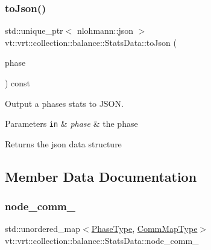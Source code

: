 \mbox{\label{structvt_1_1vrt_1_1collection_1_1balance_1_1_stats_data_ac864e580e764d093b427e459d46b2bd4}} 
\subsubsection{\texorpdfstring{to\+Json()}{toJson()}}
{\footnotesize\ttfamily std\+::unique\+\_\+ptr$<$ nlohmann\+::json $>$ vt\+::vrt\+::collection\+::balance\+::\+Stats\+Data\+::to\+Json (\begin{DoxyParamCaption}\item[{\hyperlink{namespacevt_a46ce6733d5cdbd735d561b7b4029f6d7}{Phase\+Type}}]{phase }\end{DoxyParamCaption}) const}



Output a phase\textquotesingle{}s stats to J\+S\+ON. 


\begin{DoxyParams}[1]{Parameters}
\mbox{\tt in}  & {\em phase} & the phase\\
\hline
\end{DoxyParams}
\begin{DoxyReturn}{Returns}
the json data structure 
\end{DoxyReturn}


\subsection{Member Data Documentation}
\mbox{\label{structvt_1_1vrt_1_1collection_1_1balance_1_1_stats_data_a5ee2aea35e48a4855c8f99c16b588287}} 
\subsubsection{\texorpdfstring{node\+\_\+comm\+\_\+}{node\_comm\_}}
{\footnotesize\ttfamily std\+::unordered\+\_\+map$<$\hyperlink{namespacevt_a46ce6733d5cdbd735d561b7b4029f6d7}{Phase\+Type}, \hyperlink{namespacevt_1_1vrt_1_1collection_1_1balance_a10860c956804d644db54a16012352728}{Comm\+Map\+Type}$>$ vt\+::vrt\+::collection\+::balance\+::\+Stats\+Data\+::node\+\_\+comm\+\_\+}



